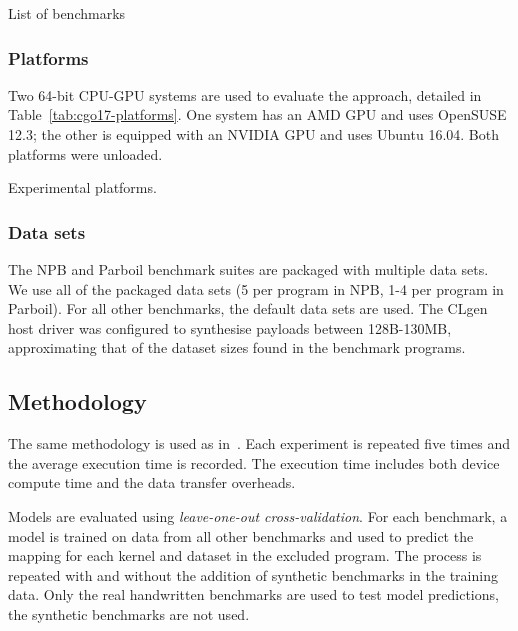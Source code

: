 \begin{table}%
  \centering%
  
  \caption[List of benchmarks]{List of benchmarks} %
  \label{tab:cgo17-benchmarks} %
\end{table}

\subsubsection{Platforms} 

Two 64-bit CPU-GPU systems are used to evaluate the approach, detailed in Table~\ref{tab:cgo17-platforms}. One system has an AMD GPU and uses OpenSUSE 12.3; the other is equipped with an NVIDIA GPU and uses Ubuntu 16.04. Both platforms were unloaded.

\begin{table}%
  \centering %
	
  \caption[Experimental platforms]{Experimental platforms.}
  \label{tab:cgo17-platforms}
\end{table}

\subsubsection{Data sets}

The NPB and Parboil benchmark suites are packaged with multiple data sets. We use all of the packaged data sets (5 per program in NPB, 1-4 per program in Parboil). For all other benchmarks, the default data sets are used. The CLgen host driver was configured to synthesise payloads between 128B-130MB, approximating that of the dataset sizes found in the benchmark programs.


\subsection{Methodology}

The same methodology is used as in~\cite{Grewe2013}. Each experiment is repeated five times and the average execution time is recorded. The execution time includes both device compute time and the data transfer overheads.

Models are evaluated using \emph{leave-one-out cross-validation}. For each benchmark, a model is trained on data from all other benchmarks and used to predict the mapping for each kernel and dataset in the excluded program. The process is repeated with and without the addition of synthetic benchmarks in the training data. Only the real handwritten benchmarks are used to test model predictions, the synthetic benchmarks are not used.
